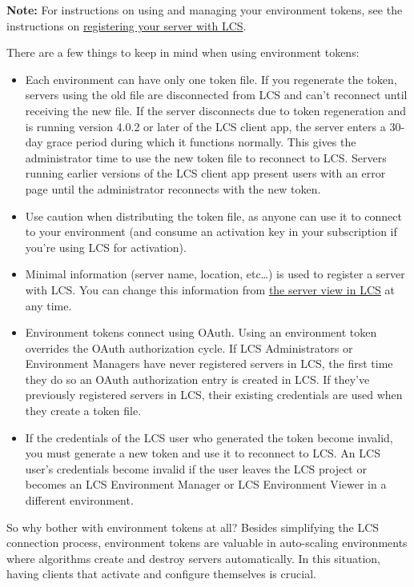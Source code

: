 \textbf{Note:} For instructions on using and managing your environment
tokens, see the instructions on
\href{/docs/7-2/deploy/-/knowledge_base/d/activating-your-liferay-dxp-server-with-lcs}{registering
your server with LCS}.

\noindent\hrulefill

There are a few things to keep in mind when using environment tokens:

\begin{itemize}
\item
  Each environment can have only one token file. If you regenerate the
  token, servers using the old file are disconnected from LCS and can't
  reconnect until receiving the new file. If the server disconnects due
  to token regeneration and is running version 4.0.2 or later of the LCS
  client app, the server enters a 30-day grace period during which it
  functions normally. This gives the administrator time to use the new
  token file to reconnect to LCS. Servers running earlier versions of
  the LCS client app present users with an error page until the
  administrator reconnects with the new token.
\item
  Use caution when distributing the token file, as anyone can use it to
  connect to your environment (and consume an activation key in your
  subscription if you're using LCS for activation).
\item
  Minimal information (server name, location, etc\ldots) is used to
  register a server with LCS. You can change this information from
  \href{/docs/7-2/deploy/-/knowledge_base/d/managing-lcs-servers}{the
  server view in LCS} at any time.
\item
  Environment tokens connect using OAuth. Using an environment token
  overrides the OAuth authorization cycle. If LCS Administrators or
  Environment Managers have never registered servers in LCS, the first
  time they do so an OAuth authorization entry is created in LCS. If
  they've previously registered servers in LCS, their existing
  credentials are used when they create a token file.
\item
  If the credentials of the LCS user who generated the token become
  invalid, you must generate a new token and use it to reconnect to LCS.
  An LCS user's credentials become invalid if the user leaves the LCS
  project or becomes an LCS Environment Manager or LCS Environment
  Viewer in a different environment.
\end{itemize}

So why bother with environment tokens at all? Besides simplifying the
LCS connection process, environment tokens are valuable in auto-scaling
environments where algorithms create and destroy servers automatically.
In this situation, having clients that activate and configure themselves
is crucial.

